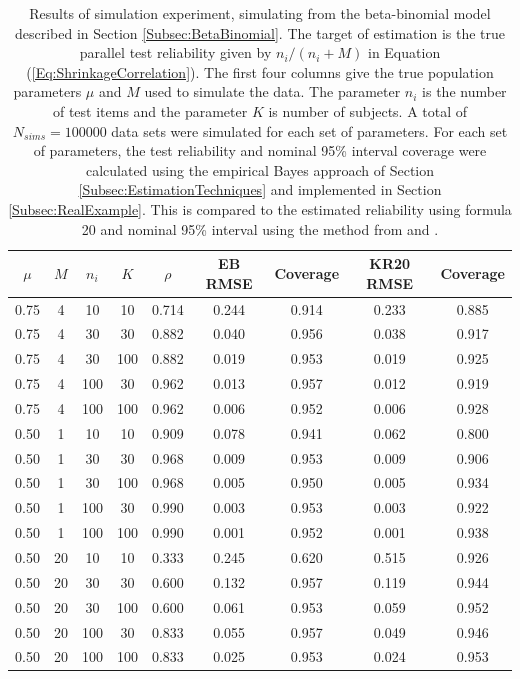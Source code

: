 \documentclass[12pt,epsfig]{article}
\begin{document}
\begin{table}
    \centering
    \begin{tabular}{| c | c | c | c | c || c | c || c | c |} \hline
     $\mu$ & $M$ & $n_i$ & $K$ & $\rho$ & EB RMSE & Coverage & KR20 RMSE & Coverage\\ \hline
        0.75 & 4 & 10 & 10 & 0.714 & 0.244 & 0.914 & 0.233 & 0.885\\ %
        0.75 & 4 & 30 & 30 & 0.882 & 0.040 & 0.956 & 0.038 & 0.917\\ %
        0.75 & 4 & 30 & 100 & 0.882 & 0.019 & 0.953 & 0.019 & 0.925\\ %
        0.75 & 4 & 100 & 30 & 0.962 & 0.013 & 0.957 & 0.012 & 0.919 \\ %
        0.75 & 4 & 100 & 100 & 0.962 & 0.006 & 0.952 & 0.006 & 0.928\\ %
        0.50 & 1 & 10 & 10 & 0.909 & 0.078 & 0.941 & 0.062 & 0.800\\ %
        0.50 & 1 & 30 & 30 & 0.968 & 0.009 & 0.953 & 0.009 & 0.906\\ %
        0.50 & 1 & 30 & 100 & 0.968 & 0.005 & 0.950 & 0.005 & 0.934\\ %
        0.50 & 1 & 100 & 30 & 0.990 & 0.003 & 0.953 & 0.003 & 0.922\\ %
        0.50 & 1 & 100 & 100 & 0.990 & 0.001 & 0.952 & 0.001 & 0.938\\ %
        0.50 & 20 & 10 & 10 & 0.333 & 0.245 & 0.620 & 0.515 & 0.926\\ %
        0.50 & 20 & 30 & 30 & 0.600 & 0.132 & 0.957 & 0.119 & 0.944\\ %
        0.50 & 20 & 30 & 100 & 0.600 & 0.061 & 0.953 & 0.059 & 0.952\\ %
        0.50 & 20 & 100 & 30 & 0.833 & 0.055 & 0.957 & 0.049 & 0.946\\ %
        0.50 & 20 & 100 & 100 & 0.833 & 0.025 & 0.953 & 0.024 & 0.953\\ \hline %
    \end{tabular}
\caption{Results of simulation experiment, simulating from the beta-binomial model described in Section \ref{Subsec:BetaBinomial}. The target of estimation is the true parallel test reliability given by $n_i/(n_i + M)$ in Equation (\ref{Eq:ShrinkageCorrelation}). The first four columns give the true population parameters $\mu$ and $M$ used to simulate the data. The parameter $n_i$ is the number of test items and the parameter $K$ is number of subjects. A total of $N_{sims} = 100000$ data sets were simulated for each set of parameters. For each set of parameters, the test reliability and nominal 95\% interval coverage were calculated using the empirical Bayes approach of Section \ref{Subsec:EstimationTechniques} and implemented in Section \ref{Subsec:RealExample}. This is compared to the estimated reliability using \cite{Kuder1937} formula 20 and nominal 95\% interval using the method from \cite{Feldt1965} and \cite{Feldt1987}. }
\label{Table:SimulationStudy}
\end{table}
\newpage
\end{document}
